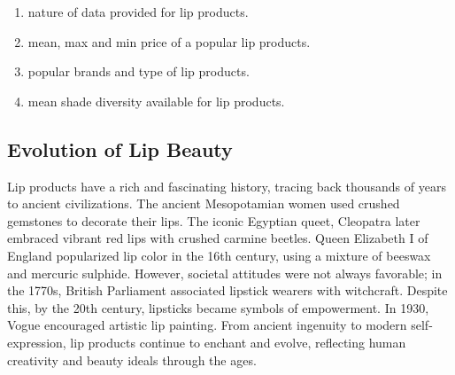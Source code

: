 \documentclass{article}
\begin{document}
\begin{enumerate}
    \item nature of data provided for lip products.
    \item mean, max and min price of a popular lip products.
    \item popular brands and type of lip products.
    \item mean shade diversity available for lip products.
\end{enumerate}

\subsection{Evolution of Lip Beauty}

Lip products have a rich and fascinating history, tracing back thousands of years to ancient civilizations. The ancient Mesopotamian women used crushed gemstones to decorate their lips. The iconic Egyptian queet, Cleopatra later embraced vibrant red lips with crushed carmine beetles. Queen Elizabeth I of England popularized lip color in the 16th century, using a mixture of beeswax and mercuric sulphide. However, societal attitudes were not always favorable; in the 1770s, British Parliament associated lipstick wearers with witchcraft. Despite this, by the 20th century, lipsticks became symbols of empowerment. In 1930, Vogue encouraged artistic lip painting. From ancient ingenuity to modern self-expression, lip products continue to enchant and evolve, reflecting human creativity and beauty ideals through the ages.
\end{document}
